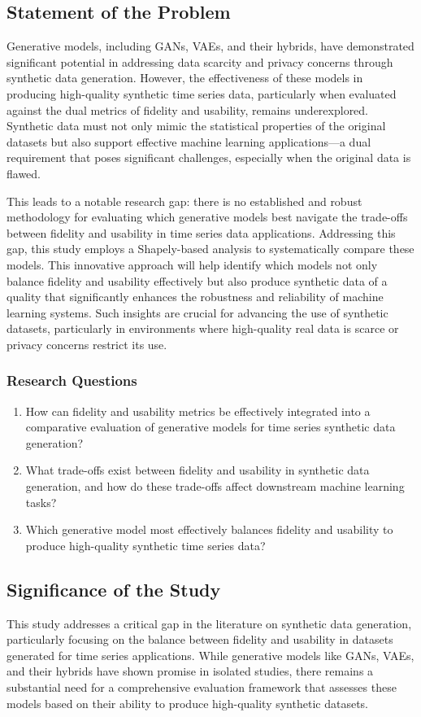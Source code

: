 \documentclass{article}
\begin{document}
\subsection{Statement of the Problem}
Generative models, including GANs, VAEs, and their hybrids, have demonstrated significant potential in addressing data scarcity and privacy concerns through synthetic data generation. However, the effectiveness of these models in producing high-quality synthetic time series data, particularly when evaluated against the dual metrics of fidelity and usability, remains underexplored. Synthetic data must not only mimic the statistical properties of the original datasets but also support effective machine learning applications—a dual requirement that poses significant challenges, especially when the original data is flawed.

This leads to a notable research gap: there is no established and robust methodology for evaluating which generative models best navigate the trade-offs between fidelity and usability in time series data applications. Addressing this gap, this study employs a Shapely-based analysis to systematically compare these models. This innovative approach will help identify which models not only balance fidelity and usability effectively but also produce synthetic data of a quality that significantly enhances the robustness and reliability of machine learning systems. Such insights are crucial for advancing the use of synthetic datasets, particularly in environments where high-quality real data is scarce or privacy concerns restrict its use.

\subsubsection{Research Questions}
\begin{enumerate}
    \item How can fidelity and usability metrics be effectively integrated into a comparative evaluation of generative models for time series synthetic data generation?
    \item What trade-offs exist between fidelity and usability in synthetic data generation, and how do these trade-offs affect downstream machine learning tasks?
    \item Which generative model most effectively balances fidelity and usability to produce high-quality synthetic time series data?
\end{enumerate}

\subsection{Significance of the Study}
This study addresses a critical gap in the literature on synthetic data generation, particularly focusing on the balance between fidelity and usability in datasets generated for time series applications. While generative models like GANs, VAEs, and their hybrids have shown promise in isolated studies, there remains a substantial need for a comprehensive evaluation framework that assesses these models based on their ability to produce high-quality synthetic datasets.
\end{document}
